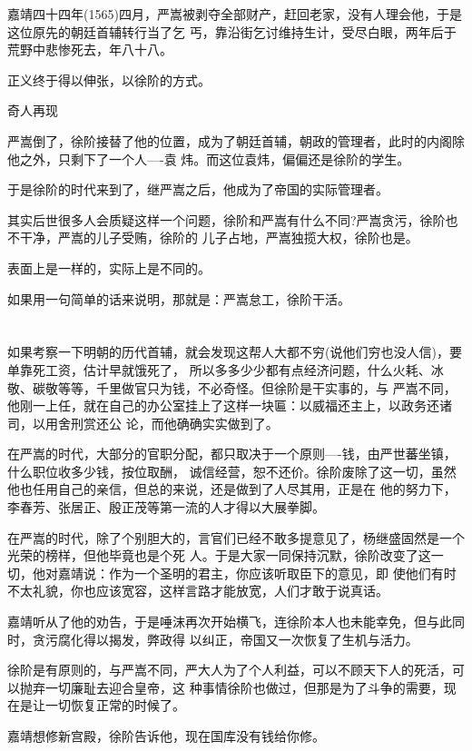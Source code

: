 \documentclass[11pt,a4paper,onecolumn]{article}
\begin{document}
嘉靖四十四年(1565)四月，严嵩被剥夺全部财产，赶回老家，没有人理会他，于是这位原先的朝廷首辅转行当了乞
丐，靠沿街乞讨维持生计，受尽白眼，两年后于荒野中悲惨死去，年八十八。

正义终于得以伸张，以徐阶的方式。

奇人再现

严嵩倒了，徐阶接替了他的位置，成为了朝廷首辅，朝政的管理者，此时的内阁除他之外，只剩下了一个人----袁
炜。而这位袁炜，偏偏还是徐阶的学生。

于是徐阶的时代来到了，继严嵩之后，他成为了帝国的实际管理者。

其实后世很多人会质疑这样一个问题，徐阶和严嵩有什么不同?严嵩贪污，徐阶也不干净，严嵩的儿子受贿，徐阶的
儿子占地，严嵩独揽大权，徐阶也是。

表面上是一样的，实际上是不同的。

如果用一句简单的话来说明，那就是：严嵩怠工，徐阶干活。

\section[\thesection]{}

如果考察一下明朝的历代首辅，就会发现这帮人大都不穷(说他们穷也没人信)，要单靠死工资，估计早就饿死了，
所以多多少少都有点经济问题，什么火耗、冰敬、碳敬等等，千里做官只为钱，不必奇怪。但徐阶是干实事的，与
严嵩不同，他刚一上任，就在自己的办公室挂上了这样一块匾：以威福还主上，以政务还诸司，以用舍刑赏还公
论，而他确确实实做到了。

在严嵩的时代，大部分的官职分配，都只取决于一个原则----钱，由严世蕃坐镇，什么职位收多少钱，按位取酬，
诚信经营，恕不还价。徐阶废除了这一切，虽然他也任用自己的亲信，但总的来说，还是做到了人尽其用，正是在
他的努力下，李春芳、张居正、殷正茂等第一流的人才得以大展拳脚。

在严嵩的时代，除了个别胆大的，言官们已经不敢多提意见了，杨继盛固然是一个光荣的榜样，但他毕竟也是个死
人。于是大家一同保持沉默，徐阶改变了这一切，他对嘉靖说：作为一个圣明的君主，你应该听取臣下的意见，即
使他们有时不太礼貌，你也应该宽容，这样言路才能放宽，人们才敢于说真话。

嘉靖听从了他的劝告，于是唾沫再次开始横飞，连徐阶本人也未能幸免，但与此同时，贪污腐化得以揭发，弊政得
以纠正，帝国又一次恢复了生机与活力。

徐阶是有原则的，与严嵩不同，严大人为了个人利益，可以不顾天下人的死活，可以抛弃一切廉耻去迎合皇帝，这
种事情徐阶也做过，但那是为了斗争的需要，现在是让一切恢复正常的时候了。

嘉靖想修新宫殿，徐阶告诉他，现在国库没有钱给你修。
\end{document}
